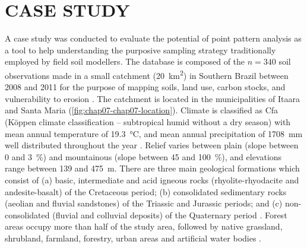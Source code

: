 \section{CASE STUDY}

A  case study was conducted to evaluate the potential of point pattern analysis as a tool to help 
understanding the purposive sampling strategy traditionally employed by field soil modellers. The database is 
composed of the $n = 340$ soil observations made in a small catchment (\SI{20}{\km\squared}) in Southern Brazil 
between \num{2008} and \num{2011} for the purpose of mapping soils, land use, carbon stocks, and vulnerability 
to erosion \cite{SamuelRosaEtAl2011a, MiguelEtAl2012, Samuel-RosaEtAl2013}. The catchment is located in the 
municipalities of Itaara and Santa Maria (\autoref{fig:chap07-chap07-location}). Climate is classified as Cfa 
(K{\"o}ppen climate classification -- subtropical humid without a dry season) with mean annual temperature of 
\SI{19.3}{\celsius}, and mean annual precipitation of \SI{1708}{\mm} well distributed throughout the year 
\cite{Maluf2000}. Relief varies between plain (slope between \num{0} and \SI{3}{\percent}) and mountainous 
(slope between \num{45} and \SI{100}{\percent}), and elevations range between \num{139} and \SI{475}{\m}. There 
are three main geological formations which consist of (a) basic, intermediate and acid igneous rocks 
(rhyolite-rhyodacite and andesite-basalt) of the Cretaceous period; (b) consolidated sedimentary rocks (aeolian 
and fluvial sandstones) of the Triassic and Jurassic periods; and (c) non-consolidated (fluvial and colluvial 
deposits) of the Quaternary period \cite{GasparettoEtAl1988, MacielFilho1990, Sartori2009}. Forest areas occupy 
more than half of the study area, followed by native grassland, shrubland, farmland, forestry, urban areas and 
artificial water bodies \cite{SamuelRosaEtAl2011a}.

